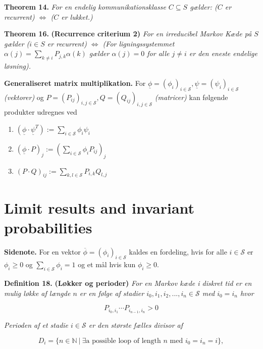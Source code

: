 \documentclass[
]{book}
\providecommand{\tightlist}{%
  \setlength{\itemsep}{0pt}\setlength{\parskip}{0pt}}
\begin{document}
\textbf{Theorem 14.} \emph{For en endelig kommunikationsklasse \(C\subseteq S\) gælder: (\(C\) er recurrent) \(\Leftrightarrow\) (\(C\) er lukket.)}

\textbf{Theorem 16.} \textbf{(Recurrence criterium 2)} \emph{For en irreducibel Markov Kæde på \(S\) gælder (\(i\in S\) er recurrent) \(\Leftrightarrow\) (For ligningssystemmet \(\alpha(j)=\sum_{k\ne i}P_{j,k}\alpha(k)\) gælder \(\alpha(j)=0\) for alle \(j\ne i\) er den eneste endelige løsning).}

\textbf{Generaliseret matrix multiplikation.} For \(\underline{\phi}=(\phi_i)_{i\in\mathcal{S}},\underline{\psi}=(\psi_i)_{i\in\mathcal{S}}\) \emph{(vektorer)} og \(P=(P_{ij})_{i,j\in\mathcal{S}},Q=(Q_{ij})_{i,j\in\mathcal{S}}\) \emph{(matricer)} kan følgende produkter udregnes ved

\begin{enumerate}
\def\labelenumi{\roman{enumi}.}
\tightlist
\item
  \((\underline{\phi}\cdot \underline{\psi}^T):=\sum_{i\in\mathcal{S}}\phi_i\psi_i\)
\item
  \((\underline{\phi}\cdot P)_j:=\left(\sum_{i\in\mathcal{S}}\phi_i P_{ij}\right)_j\)
\item
  \((P\cdot Q)_{ij}:=\sum_{k,l\in\mathcal{S}}P_{i,k}Q_{l,j}\)
\end{enumerate}

\hypertarget{limit-results-and-invariant-probabilities}{%
\section{Limit results and invariant probabilities}\label{limit-results-and-invariant-probabilities}}

\textbf{Sidenote.} For en vektor \(\overline{\phi}=(\phi_i)_{i\in \mathcal{S}}\) kaldes en fordeling, hvis for alle \(i\in\mathcal{S}\) er \(\phi_i\ge0\) og \(\sum_{i\in\mathcal{S}}\phi_i=1\) og et mål hvis kun \(\phi_i\ge 0\).

\textbf{Definition 18.} \textbf{(Løkker og perioder)} \emph{For en Markov kæde i diskret tid er en mulig løkke af længde \(n\) er en følge af stadier \(i_0,i_1,i_2,...,i_n\in\mathcal{S}\) med \(i_0=i_n\) hvor}

\[
P_{i_0,i_1}\cdots P_{i_{n-1},i_n}>0
\]

\emph{Perioden af et stadie \(i\in\mathcal{S}\) er den største fælles divisor af}

\[
D_i=\{n\in\mathbb{N}\ \vert\ \exists \text{a possible loop of length $n$ med $i_0=i_n=i$}\},
\]
\end{document}
